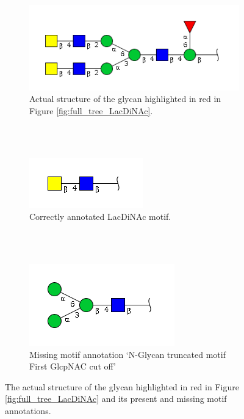 \documentclass[12pt,a4paper]{article}
\begin{document}
\begin{figure}[ht!]
    \centering
    \begin{subfigure}[t]{1.0\textwidth}
        \centering
        \includegraphics[scale=0.6]{trees/rogue_LacDiNAc_structure.png}
        \caption{Actual structure of the glycan highlighted in red in Figure \ref{fig:full_tree_LacDiNAc}.}
        \label{fig:rogue_lacdinac_a}
    \end{subfigure}%
    \\
    \bigbreak
    ~ 
	\\
    \begin{subfigure}[t]{1.0\textwidth}
        \centering
        \includegraphics[scale=0.6]{trees/LacDiNAc_motif.png}
        \caption{Correctly annotated LacDiNAc motif.}
        \label{fig:rogue_lacdinac_b}
    \end{subfigure}
    \\
    \bigbreak
    ~ 
	\\
    \begin{subfigure}[t]{1.0\textwidth}
        \centering
        \includegraphics[scale=0.6]{trees/N-Glycan_truncated_motif__First_GlcpNAC_cut_off_motif.png}
        \caption{Missing motif annotation `N-Glycan truncated motif First GlcpNAC cut off'}
        \label{fig:rogue_lacdinac_c}
    \end{subfigure}
    \caption{The actual structure of the glycan highlighted in red in Figure \ref{fig:full_tree_LacDiNAc} and its present and missing motif annotations.}
\label{fig:rogue_lacdinac}
\end{figure}
\end{document}
